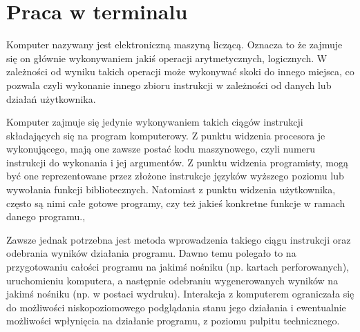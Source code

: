 % 
% 
% 
% 

\section{Praca w terminalu}

Komputer nazywany jest elektroniczną maszyną liczącą. Oznacza to że zajmuje się on głównie wykonywaniem jakiś operacji arytmetycznych, logicznych.
W zależności od wyniku takich operacji może wykonywać skoki do innego miejsca, co pozwala czyli wykonanie innego zbioru instrukcji w zależności od danych lub działań użytkownika.

Komputer zajmuje się jedynie wykonywaniem takich ciągów instrukcji składających się na program komputerowy.
Z punktu widzenia procesora je wykonującego, mają one zawsze postać kodu maszynowego, czyli numeru instrukcji do wykonania i jej argumentów.
Z punktu widzenia programisty, mogą być one reprezentowane przez złożone instrukcje języków wyższego poziomu lub wywołania funkcji bibliotecznych.
Natomiast z punktu widzenia użytkownika, często są nimi całe gotowe programy, czy też jakieś konkretne funkcje w ramach danego programu.,

Zawsze jednak potrzebna jest metoda wprowadzenia takiego ciągu instrukcji oraz odebrania wyników działania programu.
Dawno temu polegało to na przygotowaniu całości programu na jakimś nośniku (np. kartach perforowanych), uruchomieniu komputera, a następnie odebraniu wygenerowanych wyników na jakimś nośniku (np. w postaci wydruku).
Interakcja z komputerem ograniczała się do możliwości niskopoziomowego podglądania stanu jego działania i ewentualnie możliwości wpłynięcia na działanie programu, z poziomu pulpitu technicznego.

